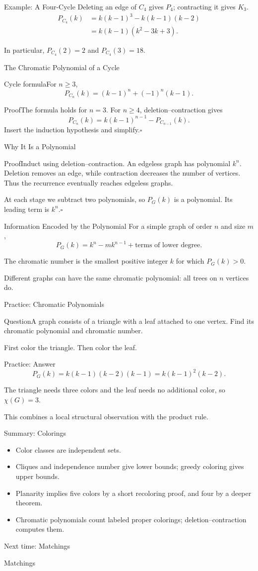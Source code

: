 \documentclass[aspectratio=169,11pt]{beamer}
\newcommand{\Thm}[2]{\begin{block}{#1}#2\end{block}}
\renewcommand{\Proof}[1]{\begin{block}{Proof}\normalsize #1\end{block}}
\newcommand{\Question}[1]{\begin{block}{Question}#1\end{block}}
\newcommand{\gap}{\par\medskip}
\begin{document}
\begin{frame}{Example: A Four-Cycle}
\large
Deleting an edge of $C_4$ gives $P_4$; contracting it gives $K_3$.
\begin{align*}P_{C_4}(k)&=k(k-1)^3-k(k-1)(k-2)\\&=k(k-1)(k^2-3k+3).\end{align*}
\gap In particular, $P_{C_4}(2)=2$ and $P_{C_4}(3)=18$.
\end{frame}
\begin{frame}{The Chromatic Polynomial of a Cycle}
\large
\Thm{Cycle formula}{For $n\ge3$,\[P_{C_n}(k)=(k-1)^n+(-1)^n(k-1).\]}
\Proof{The formula holds for $n=3$. For $n\ge4$, deletion--contraction gives\[P_{C_n}(k)=k(k-1)^{n-1}-P_{C_{n-1}}(k).\]Insert the induction hypothesis and simplify.\hfill$\square$}
\end{frame}
\begin{frame}{Why It Is a Polynomial}
\large
\Proof{Induct using deletion--contraction. An edgeless graph has polynomial $k^n$. Deletion removes an edge, while contraction decreases the number of vertices. Thus the recurrence eventually reaches edgeless graphs.\gap At each stage we subtract two polynomials, so $P_G(k)$ is a polynomial. Its leading term is $k^n$.\hfill$\square$}
\end{frame}
\begin{frame}{Information Encoded by the Polynomial}
\large
For a simple graph of order $n$ and size $m$,
\[P_G(k)=k^n-mk^{n-1}+\text{terms of lower degree}.\]
\gap The chromatic number is the smallest positive integer $k$ for which $P_G(k)>0$.
\gap Different graphs can have the same chromatic polynomial: all trees on $n$ vertices do.
\end{frame}
\begin{frame}{Practice: Chromatic Polynomials}
\large
\Question{A graph consists of a triangle with a leaf attached to one vertex. Find its chromatic polynomial and chromatic number.}
\gap First color the triangle. Then color the leaf.
\end{frame}
\begin{frame}{Practice: Answer}
\large
\[P_G(k)=k(k-1)(k-2)(k-1)=k(k-1)^2(k-2).\]
\gap The triangle needs three colors and the leaf needs no additional color, so $\chi(G)=3$.
\gap This combines a local structural observation with the product rule.
\end{frame}
\begin{frame}{Summary: Colorings}
\large
\begin{itemize}\setlength{\itemsep}{.23cm}
\item Color classes are independent sets.
\item Cliques and independence number give lower bounds; greedy coloring gives upper bounds.
\item Planarity implies five colors by a short recoloring proof, and four by a deeper theorem.
\item Chromatic polynomials count labeled proper colorings; deletion--contraction computes them.
\end{itemize}
\end{frame}
\begin{frame}{Next time: Matchings}\begin{center}{\Huge Matchings}\end{center}\end{frame}
\end{document}
